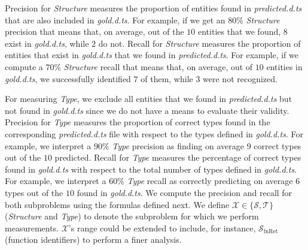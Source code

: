 \documentclass[sigplan,10pt,review,anonymous]{acmart} %
\theoremstyle{plain}
\theoremstyle{remark}
\theoremstyle{definition}
\begin{document}
Precision for \textit{Structure} measures the proportion of entities found in \textit{predicted.d.ts}
that are also included in \textit{gold.d.ts}.
%
For example, if we get an $80\%$ \textit{Structure} precision that means
that, on average, out of the $10$ entities that we found, $8$ exist in \textit{gold.d.ts}, while $2$ do not.
%
Recall for \textit{Structure} measures the proportion of entities that exist in \textit{gold.d.ts}
that we found in \textit{predicted.d.ts}.
%
For example, if we compute a $70\%$ \textit{Structure} recall
that means that, on average, out of $10$ entities in \textit{gold.d.ts},
we successfully identified $7$ of them, while $3$ were not recognized.

For measuring \textit{Type}, we exclude all entities that we found in \textit{predicted.d.ts}
but not found in \textit{gold.d.ts} since we do not have a means to evaluate their validity.
%
Precision for \textit{Type} measures the proportion of correct types
found in the corresponding \textit{predicted.d.ts} file
with respect to the types defined in \textit{gold.d.ts}.
%
For example, we interpret a $90\%$ \textit{Type} precision
as finding on average $9$ correct types out of the $10$ predicted.
%
Recall for \textit{Type} measures the percentage of correct types
found in \textit{gold.d.ts} with respect to the total number of types defined in \textit{gold.d.ts}.
%
For example, we interpret a $60\%$ \textit{Type} recall
as correctly predicting on average $6$ types out of the $10$ found in \textit{gold.d.ts}.
%
We compute the precision and recall for both subproblems using the formulas defined next.
%
We define $\mathcal{X} \in \{\mathcal{S}, \mathcal{T}\}$ (\textit{Structure} and \textit{Type})
to denote the subproblem for which we perform measurements.
%
$\mathcal{X}$'s range could be extended to include, for instance,
$\mathcal{S}_\text{fnRet}$ (function identifiers) to perform a finer analysis.
\end{document}
